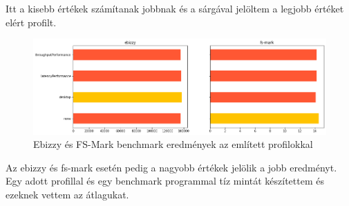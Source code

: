 Itt a kisebb értékek számítanak jobbnak és a sárgával jelöltem a legjobb értéket elért profilt.

\begin{figure}[h!]
\centering
\includegraphics[width=\textwidth]{images/ebizzyAndFsMark.png}
\caption{Ebizzy és FS-Mark benchmark eredmények az említett profilokkal}
\label{fig:tunedProfilesEbizzyAndFsmark}
\end{figure}

Az ebizzy és fs-mark esetén pedig a nagyobb értékek jelölik a jobb eredményt.
Egy adott profillal és egy benchmark programmal tíz mintát készítettem és ezeknek vettem az átlagukat.

